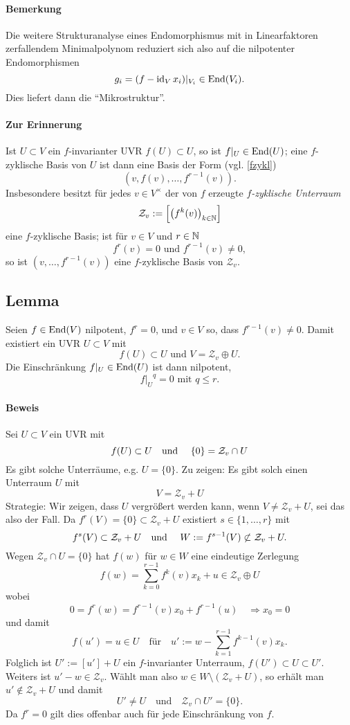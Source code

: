 \paragraph{Bemerkung}
	Die weitere Strukturanalyse eines Endomorphismus mit in Linearfaktoren zerfallendem Minimalpolynom reduziert sich also auf die nilpotenter Endomorphismen
		\[ g_i = (f-\operatorname{id}_Vx_i)|_{V_i}\in \operatorname{End}(V_i). \]
	Dies liefert dann die "`Mikrostruktur"'.
\paragraph{Zur Erinnerung}
	Ist $ U\subset V $ ein $ f $-invarianter UVR $ f(U)\subset U $, so ist $ f|_U\in \operatorname{End}(U) $; eine $ f $-zyklische Basis von $ U $ ist dann eine Basis der Form (vgl. \ref{fzykl})
		\[ \left(v,f(v),\dots,f^{r-1}(v)\right). \]
	Insbesondere besitzt für jedes $ v\in V^\times $ der von $ f $ erzeugte \emph{$ f $-zyklische Unterraum}
		\[ \mathcal{Z}_v := \left[\left(f^k(v)\right)_{k\in \mathbb{N}}\right] \]
	eine $ f $-zyklische Basis; ist für $ v\in V $ und $ r\in \mathbb{N} $
		\[ f^r(v) = 0 \text{ und }f^{r-1}(v)\neq 0, \]
	so ist $ (v,\dots,f^{r-1}(v)) $ eine $ f $-zyklische Basis von $ \mathcal{Z}_v $.
\subsection{Lemma}
\begin{Lemma}[]
	Seien $ f\in \operatorname{End}(V) $ nilpotent, $ f^r = 0 $, und $ v\in V $ so, dass $ f^{r-1}(v)\neq 0 $. Damit existiert ein UVR $ U\subset V $ mit
		\[ f(U)\subset U \text{ und } V = \mathcal{Z}_v \oplus U. \]
	Die Einschränkung $ f|_U \in \operatorname{End}(U) $ ist dann nilpotent,
		\[ {f|_U}^q = 0 \text{ mit } q\leq r. \]
\end{Lemma}
\paragraph{Beweis}
	Sei $U\subset V$ ein UVR mit
		\[f(U)\subset U \text{\quad und \quad} \{0\}=\mathcal{Z}_v\cap U\]
	Es gibt solche Unterräume, e.g. $U=\{0\}$. Zu zeigen: Es gibt solch einen Unterraum $U$ mit
		\[V=\mathcal{Z}_v+U\]
	Strategie: Wir zeigen, dass $U$ vergrößert werden kann, wenn $V\neq \mathcal{Z}_v+U$, sei das also der Fall.
	Da $f^r(V)=\{0\}\subset \mathcal{Z}_v+U$ existiert $s\in\{1,\dots,r\}$ mit
		\[f^s(V)\subset \mathcal{Z}_v+U \text{\quad und \quad} W:=f^{s-1}(V)\not\subset \mathcal{Z}_v+U. \]
	Wegen $\mathcal{Z}_v\cap U  = \{0\}$ hat $f(w)$ für $w\in W$ eine eindeutige Zerlegung
		\[f(w)=\sum_{k=0}^{r-1}f^k(v)x_k+u \in \mathcal{Z}_v \oplus U\]
	wobei
		\[0=f^r(w)=f^{r-1}(v)x_0+f^{r-1}(u) \quad\Rightarrow x_0=0\]
	und damit
		\[f(u')=u\in U \quad\text{für}\quad u':=w-\sum_{k=1}^{r-1} f^{k-1}(v)x_k. \]
	Folglich ist $U':=[u']+U$ ein $f$-invarianter Unterraum, $f(U')\subset U \subset U'$.
	Weiters ist $u'-w\in \mathcal{Z}_v$.
	Wählt man also $w\in W\setminus(\mathcal{Z}_v+U)$, so erhält man $u'\notin \mathcal{Z}_v+U$ und damit
		\[U'\neq U \quad\text{und}\quad \mathcal{Z}_v\cap U'=\{0\}.\]
	Da $f^r=0$ gilt dies offenbar auch für jede Einschränkung von $f$.

